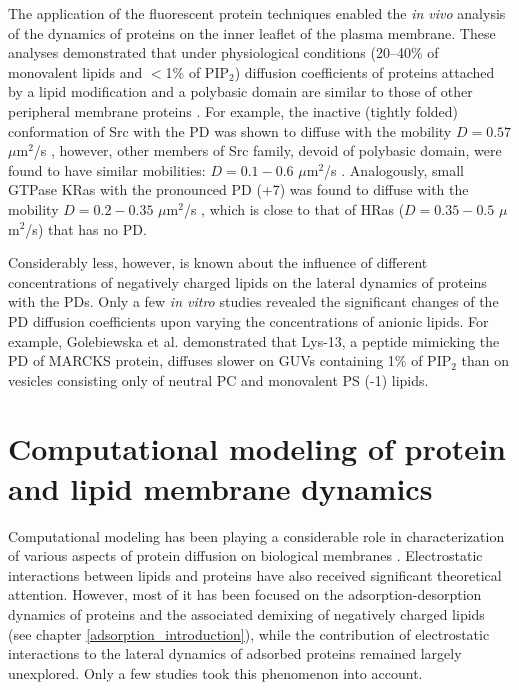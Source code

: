 The application of the fluorescent protein techniques enabled the \emph{in vivo} analysis of the dynamics of proteins on the inner leaflet of the plasma membrane. These analyses demonstrated that under physiological conditions (20--40\% of monovalent lipids and $<$1\% of PIP$_2$) diffusion coefficients of proteins attached by a lipid modification and a polybasic domain are similar to those of other peripheral membrane proteins \cite{Fivaz2003}. For example, the inactive (tightly folded) conformation of Src with the PD was shown to diffuse with the mobility $D=0.57$ $\mu$m$^{2}$/s \cite{Shvartsman2007}, however, other members of Src family, devoid of polybasic domain, were found to have similar mobilities: $D=0.1-0.6$ $\mu$m$^{2}$/s \cite{Lu2008, Larson2005, Frick2007, Pyenta2003,Zimmermann2010}. Analogously, small GTPase KRas with the pronounced PD (+7) was found to diffuse with the mobility $D=0.2-0.35$ $\mu$m$^{2}$/s \cite{Lu2008, Pyenta2003, Niv2002}, which is close to that of HRas ($D=0.35-0.5$ $\mu$m$^{2}$/s) \cite{Niv2002} that has no PD.

Considerably less, however, is known about the influence of different concentrations of negatively charged lipids on the lateral dynamics of proteins with the PDs. Only a few \emph{in vitro} studies revealed the significant changes of the PD diffusion coefficients upon varying the concentrations of anionic lipids. For example, Golebiewska et al. \cite{Golebiewska2006} demonstrated that Lys-13, a peptide mimicking the PD of MARCKS protein, diffuses slower on GUVs containing 1\% of PIP$_2$ than on vesicles consisting only of neutral PC and monovalent PS (-1) lipids.

\section{Computational modeling of protein and lipid membrane dynamics}

\label{protein_lipid_dynamics_modeling}

Computational modeling has been playing a considerable role in characterization of various aspects of protein diffusion on biological membranes \cite{Saxton1989, Sung2009, Haugh2009, Gil1998}. Electrostatic interactions between lipids and proteins have also received significant theoretical attention. However, most of it has been focused on the adsorption-desorption dynamics of proteins and the associated demixing of negatively charged lipids (see chapter \ref{adsorption_introduction}), while the contribution of electrostatic interactions to the lateral dynamics of adsorbed proteins remained largely unexplored. Only a few studies took this phenomenon into account.

